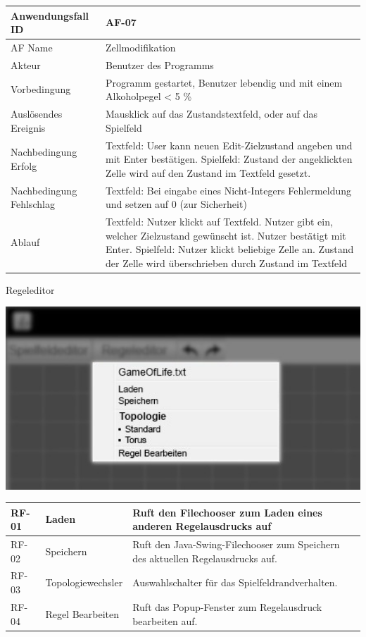 \documentclass[11pt,a4paper]{article}
\begin{document}
\begin{tabular}[m]{|m{7cm}|m{9cm}|}
    \hline
    Anwendungsfall ID     & AF-07 \\
         \hline
    AF Name     & Zellmodifikation \\
         \hline
    Akteur&Benutzer des Programms \\
    \hline
    Vorbedingung&Programm gestartet, Benutzer lebendig und mit einem Alkoholpegel < 5 \% \\
    \hline
    Auslösendes Ereignis&Mausklick auf das Zustandstextfeld, oder auf das Spielfeld\\
    \hline
    Nachbedingung Erfolg& Textfeld: User kann neuen Edit-Zielzustand angeben und mit Enter bestätigen. Spielfeld: Zustand der angeklickten Zelle wird auf den Zustand im Textfeld gesetzt. \\
    \hline
    Nachbedingung Fehlschlag&Textfeld: Bei eingabe eines Nicht-Integers Fehlermeldung und setzen auf 0 (zur Sicherheit)\\
    \hline
    Ablauf&Textfeld: Nutzer klickt auf Textfeld. Nutzer gibt ein, welcher Zielzustand gewünscht ist. Nutzer bestätigt mit Enter. 
    Spielfeld: Nutzer klickt beliebige Zelle an. Zustand der Zelle wird überschrieben durch Zustand im Textfeld\\
    \hline
\end{tabular}
\par

\pagebreak

    Regeleditor %

\par
\includegraphics[width=15cm]{regeleditor_dropdown_edit} %

\begin{longtable}[m]{|m{2cm}|m{4cm}|m{9cm}|} %
		\hline
		RF-01 & Laden & Ruft den Filechooser zum Laden eines anderen Regelausdrucks auf \\
		\hline
		RF-02 & Speichern & Ruft den Java-Swing-Filechooser zum Speichern des aktuellen Regelausdrucks auf. \\
		\hline
		RF-03 & Topologiewechsler & Auswahlschalter für das Spielfeldrandverhalten. \\
		\hline
		RF-04 & Regel Bearbeiten & Ruft das Popup-Fenster zum Regelausdruck bearbeiten auf. \\
		\hline
\end{longtable}
\pagebreak
\end{document}
